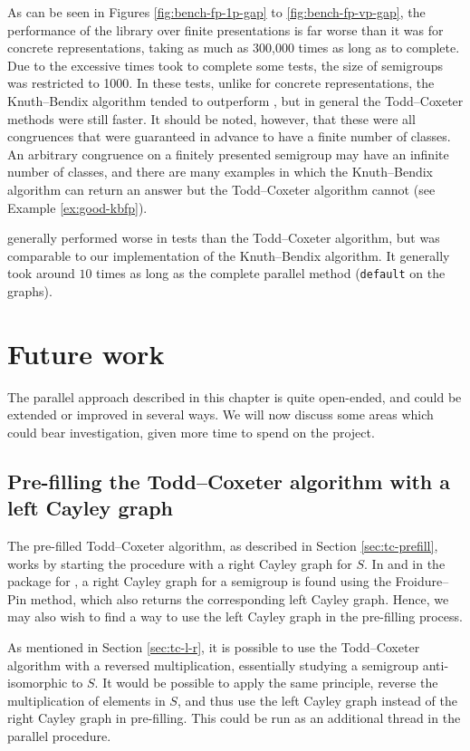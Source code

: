 As can be seen in Figures \ref{fig:bench-fp-1p-gap} to \ref{fig:bench-fp-vp-gap}, the
performance of the \GAP{} library over finite presentations is far worse
than it was for concrete representations, taking as much as 300,000 times as long
as \libsemigroups{} to complete.  Due to the excessive times \GAP{} took to
complete some tests, the size of semigroups was restricted to 1000.  In these
tests, unlike for concrete representations,
the Knuth--Bendix algorithm tended to outperform \GAP{}, but in
general the Todd--Coxeter methods were still faster.  It should be noted, however,
that these were all congruences that were guaranteed in advance to have a finite
number of classes.  An arbitrary congruence on a finitely presented semigroup
may have an infinite number of classes, and there are many examples in which
the Knuth--Bendix algorithm can return an answer but the Todd--Coxeter algorithm cannot (see Example
\ref{ex:good-kbfp}).

\kbmag{} generally performed worse in tests than the Todd--Coxeter algorithm, but was
comparable to our implementation of the Knuth--Bendix algorithm.  It generally took around
$10$ times as long as the complete parallel method (\texttt{default} on the
graphs).

\section{Future work}

The parallel approach described in this chapter is quite open-ended, and could
be extended or improved in several ways.  We will now discuss some areas which
could bear investigation, given more time to spend on the project.

\subsection{Pre-filling the Todd--Coxeter algorithm with a left Cayley graph}
\label{sec:prefill-left}
The pre-filled Todd--Coxeter algorithm, as described in Section
\ref{sec:tc-prefill}, works by starting the procedure with a right Cayley graph
for $S$.  In \libsemigroups{} and in the \Semigroups{} package for \GAP{}, a
right Cayley graph for a semigroup is found using the Froidure--Pin method, which
also returns the corresponding left Cayley graph.  Hence, we may also wish to
find a way to use the left Cayley graph in the pre-filling process.

As mentioned in Section \ref{sec:tc-l-r}, it is possible to use the Todd--Coxeter algorithm
with a reversed multiplication, essentially studying a semigroup anti-isomorphic
to $S$.  It would be possible to apply the same principle, reverse the
multiplication of elements in $S$, and thus use the left Cayley graph instead of
the right Cayley graph in pre-filling.  This could be run as an additional
thread in the parallel procedure.


